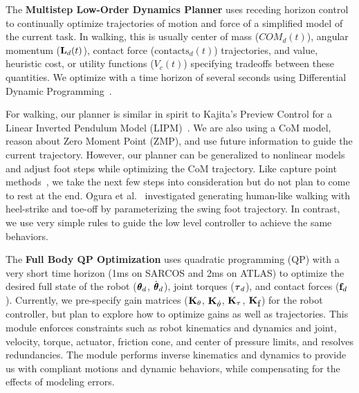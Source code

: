 \documentclass[letterpaper,12pt,fullpage]{article}
\begin{document}
The {\bf Multistep Low-Order Dynamics Planner} uses
receding horizon control to continually optimize trajectories of
motion and force of a simplified model of the current task.
In walking, this is usually center of mass ($COM_d(t)$),
angular momentum (${\bf L}_d(t)$),
contact force ($\mbox{contacts}_d(t)$) trajectories,
and value, heuristic cost, or utility functions ($V_c(t)$)
specifying tradeoffs between these quantities.
We optimize with a time horizon of several seconds
using Differential Dynamic Programming~\cite{ddp}.

For walking, our planner is similar in spirit to Kajita's Preview Control for a Linear Inverted
Pendulum Model (LIPM)~\cite{kajita03}. We are also using a CoM
model, reason about Zero Moment Point (ZMP), and use future information 
to guide the current trajectory. However, our planner can be generalized to 
nonlinear models and adjust foot steps while optimizing the CoM 
trajectory. 
Like capture point methods~\cite{capture_pt}, we take the 
next few steps into consideration but
do not plan to come to rest at the end. Ogura et al.~\cite{wabian2} 
investigated generating human-like walking with heel-strike and toe-off by 
parameterizing the swing foot trajectory. In contrast, we use very simple rules to guide the low level controller to achieve the same behaviors.

The {\bf Full Body QP Optimization} uses quadratic programming (QP) with a
very short time horizon (1ms on SARCOS and 2ms on ATLAS) to optimize the 
desired full state of the robot ($\vtheta_d$, $\dot{\vtheta}_d$),
joint torques ($\vtau_d$), and contact forces (${\bf f}_d$).
Currently, we pre-specify gain matrices 
(${\bf K}_{\theta}$, ${\bf K}_{\dot{\theta}}$, ${\bf K}_{\tau}$,
${\bf K}_{\mbox{f}}$)
for the robot controller, but plan to explore how to optimize gains
as well as trajectories.
This module enforces constraints
such as robot kinematics and dynamics 
and joint, velocity, torque, actuator, friction cone,
and center of pressure limits, and resolves redundancies.
The module performs inverse kinematics and dynamics to provide us with
compliant motions and dynamic behaviors, while compensating for the
effects of modeling errors.
\end{document}
